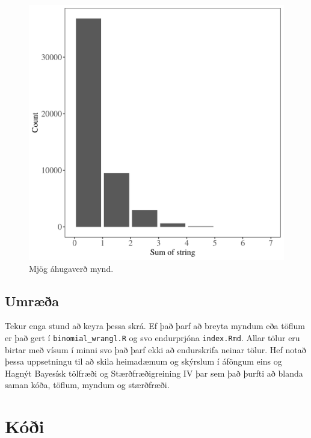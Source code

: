 \documentclass[10pt,]{article}
\begin{document}
\begin{figure}[H]

{\centering \includegraphics[width=1\linewidth]{img/sum_bp} 

}

\caption{Mjög áhugaverð mynd.}\label{fig:sumplt}
\end{figure}

\hypertarget{umruxe6uxf0a}{%
\subsection{Umræða}\label{umruxe6uxf0a}}

Tekur enga stund að keyra þessa skrá. Ef það þarf að breyta myndum eða töflum er það gert í \texttt{binomial\_wrangl.R} og svo endurprjóna \texttt{index.Rmd}. Allar tölur eru birtar með vísum í minni svo það þarf ekki að endurskrifa neinar tölur. Hef notað þessa uppsetningu til að skila heimadæmum og skýrslum í áföngum eins og Hagnýt Bayesísk tölfræði og Stærðfræðigreining IV þar sem það þurfti að blanda saman kóða, töflum, myndum og stærðfræði.

\newpage

\hypertarget{kuxf3uxf0i}{%
\section{Kóði}\label{kuxf3uxf0i}}
\end{document}
